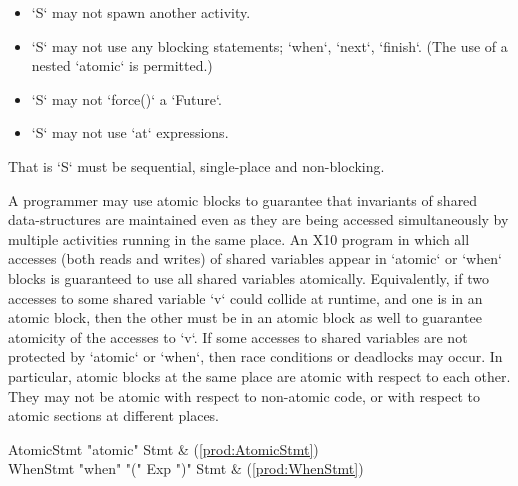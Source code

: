 \begin{itemize}
\item \xcd`S` may not spawn another activity.
\item \xcd`S` may not use any blocking statements; \xcd`when`, \xcd`next`,
      \xcd`finish`.  (The use of a nested \xcd`atomic` is permitted.)
\item \xcd`S` may not \xcd`force()` a \xcd`Future`. 
\item \xcd`S` may not use \xcd`at` expressions.
\end{itemize}
That is \xcd`S` must be sequential, single-place and non-blocking.

A programmer may use atomic blocks to guarantee that invariants of
shared data-structures are maintained even as they are being accessed
simultaneously by multiple activities running in the same place.  
An X10 program in which all accesses (both reads and writes) of shared
variables appear in \xcd`atomic` or \xcd`when` blocks is guaranteed to use all
shared variables atomically.  Equivalently, 
if two accesses to some shared variable \xcd`v` could collide at runtime, and
one is in an atomic block, then the other must be in an atomic block as well
to guarantee atomicity of the accesses to \xcd`v`. 
If some accesses to shared variables are not
protected by \xcd`atomic` or \xcd`when`, then race conditions or deadlocks may
occur. In particular, atomic blocks at the same place are atomic with respect to
each other. They may not be atomic with respect to non-atomic code, or with
respect to atomic sections at different places.

\begin{bbgrammar}
          AtomicStmt \: \xcd"atomic" Stmt & (\ref{prod:AtomicStmt}) \\
            WhenStmt \: \xcd"when" \xcd"(" Exp \xcd")" Stmt & (\ref{prod:WhenStmt}) \\
\end{bbgrammar}

